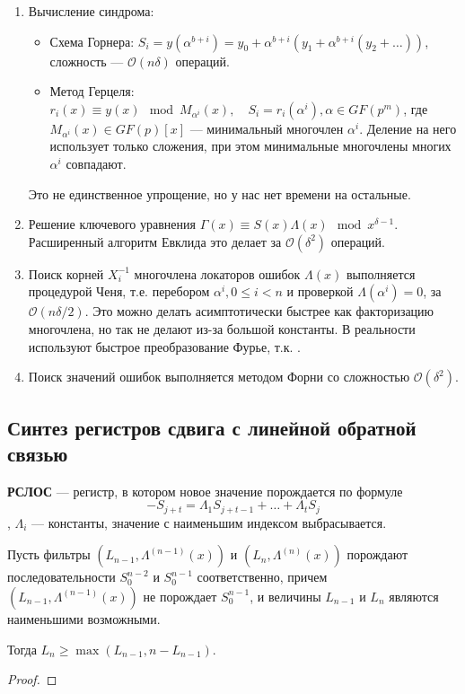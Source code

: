 \begin{enumerate}
    \item Вычисление синдрома:
\begin{itemize}
    \item Схема Горнера: \(S_i = y(\alpha^{b + i}) = y_0 + \alpha^{b + i}(y_1 +
    \alpha^{b + i}(y_2 + \dots))\), сложность --- \(\mathcal{O}(n\delta)\)
    операций.
    \item Метод Герцеля: \(r_i(x) \equiv y(x) \mod M_{\alpha^i}(x), \quad
    S_i = r_i(\alpha^i), \alpha \in GF(p^m)\), где \(M_{\alpha^i}(x) \in
    GF(p)[x]\) --- минимальный многочлен \(\alpha^i\).
    Деление на него использует только сложения,
    при этом минимальные многочлены многих \(\alpha^i\) совпадают. 
\end{itemize}
\begin{remark}
    Это не единственное упрощение, но у нас нет времени на остальные.
\end{remark}
    \item Решение ключевого уравнения \(\Gamma(x) \equiv S(x) \Lambda(x) \mod
    x^{\delta - 1}\). Расширенный алгоритм Евклида это делает за
    \(\mathcal{O}(\delta^2)\) операций.
    \item Поиск корней \(X_i^{-1}\) многочлена локаторов ошибок \(\Lambda(x)\)
    выполняется процедурой Ченя, т.е. перебором \(\alpha^i, 0 \leq i < n\)
    и проверкой \(\Lambda(\alpha^i) = 0\), за \(\mathcal{O}(n\delta / 2)\).
    Это можно делать асимптотически быстрее как факторизацию многочлена,
    но так не делают из-за большой константы.
    В реальности используют быстрое преобразование Фурье, т.к. \unfinished.
    \item Поиск значений ошибок выполняется методом Форни со сложностью
    \(\mathcal{O}(\delta^2)\).
\end{enumerate}

\subsection{Синтез регистров сдвига с линейной обратной связью}

\begin{definition}
    \textbf{РСЛОС} --- регистр, в котором новое значение порождается по формуле
    \[ - S_{j + t} = \Lambda_1 S_{j + t - 1} + \dots + \Lambda_t S_j\]
    , \(\Lambda_i\) --- константы, значение с наименьшим индексом выбрасывается.
\end{definition}

\unfinished

\begin{lemma}
    Пусть фильтры \((L_{n-1}, \Lambda^{(n - 1)}(x))\)
    и \((L_n, \Lambda^{(n)}(x))\) порождают последовательности
    \(S_0^{n - 2}\) и \(S_0^{n - 1}\) соответственно,
    причем \((L_{n-1}, \Lambda^{(n - 1)}(x))\) не порождает
    \(S_0^{n - 1}\), и величины \(L_{n-1}\) и \(L_n\) являются
    наименьшими возможными.
    
    Тогда \(L_n \geq \max(L_{n-1}, n - L_{n-1})\).
\end{lemma}
\begin{proof}
    \unfinished
\end{proof}

\unfinished